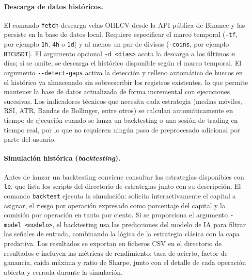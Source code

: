 \paragraph{Descarga de datos históricos.}
El comando \texttt{fetch} descarga velas OHLCV desde la API pública de Binance y las
persiste en la base de datos local. Requiere especificar el marco temporal
(\texttt{-tf}, por ejemplo \texttt{1h}, \texttt{4h} o \texttt{1d}) y al menos un par
de divisas (\texttt{-coins}, por ejemplo \texttt{BTCUSDT}). El argumento opcional
\texttt{-d <días>} acota la descarga a los últimos $n$ días; si se omite, se descarga
el histórico disponible según el marco temporal. El argumento
\texttt{-{}-detect-gaps} activa la detección y relleno automático de huecos en el
histórico ya almacenado sin sobreescribir los registros existentes, lo que permite
mantener la base de datos actualizada de forma incremental con ejecuciones
sucesivas. Los indicadores técnicos que necesita cada estrategia (medias móviles,
RSI, ATR, Bandas de Bollinger, entre otros) se calculan automáticamente en tiempo de
ejecución cuando se lanza un backtesting o una sesión de trading en tiempo real, por
lo que no requieren ningún paso de preprocesado adicional por parte del usuario.

\paragraph{Simulación histórica (\textit{backtesting}).}
Antes de lanzar un backtesting conviene consultar las estrategias disponibles con
\texttt{le}, que lista los scripts del directorio de estrategias junto con su
descripción. El comando \texttt{backtest} ejecuta la simulación: solicita
interactivamente el capital a asignar, el riesgo por operación expresado como
porcentaje del capital y la comisión por operación en tanto por ciento. Si se
proporciona el argumento \texttt{-model <modelo>}, el backtesting usa las predicciones
del modelo de IA para filtrar las señales de entrada, combinando la lógica de la
estrategia clásica con la capa predictiva. Los resultados se exportan en ficheros CSV
en el directorio de resultados e incluyen las métricas de rendimiento: tasa de acierto,
factor de ganancia, caída máxima y ratio de Sharpe, junto con el detalle de cada
operación abierta y cerrada durante la simulación.

